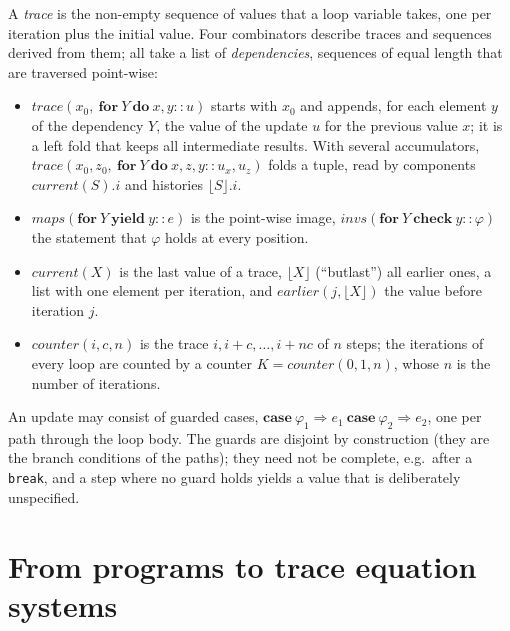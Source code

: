 \documentclass[a4paper,11pt]{article}
\newcommand{\tr}[1]{\lfloor #1\rfloor}
\begin{document}
A \emph{trace} is the non-empty sequence of values that a loop variable takes, one per iteration plus the initial
value. Four combinators describe traces and sequences derived from them; all take a list of \emph{dependencies},
sequences of equal length that are traversed point-wise:
\begin{itemize}
\item $\mathit{trace}(x_0,\ \textbf{for}\ Y \ \textbf{do}\ x, y :: u)$ starts with $x_0$ and appends, for each
  element $y$ of the dependency $Y$, the value of the update $u$ for the previous value $x$; it is a left fold that
  keeps all intermediate results. With several accumulators, $\mathit{trace}(x_0, z_0,\ \textbf{for}\ Y\
  \textbf{do}\ x, z, y :: u_x, u_z)$ folds a tuple, read by components $\mathit{current}(S).i$ and histories
  $\tr{S}.i$.
\item $\mathit{maps}(\textbf{for}\ Y\ \textbf{yield}\ y :: e)$ is the point-wise image, $\mathit{invs}(\textbf{for}\
  Y\ \textbf{check}\ y :: \varphi)$ the statement that $\varphi$ holds at every position.
\item $\mathit{current}(X)$ is the last value of a trace, $\tr{X}$ (``butlast'') all earlier ones, a list with one
  element per iteration, and $\mathit{earlier}(j, \tr{X})$ the value before iteration $j$.
\item $\mathit{counter}(i, c, n)$ is the trace $i, i + c, \dots, i + n c$ of $n$ steps; the iterations of every loop
  are counted by a counter $K = \mathit{counter}(0, 1, n)$, whose $n$ is the number of iterations.
\end{itemize}
An update may consist of guarded cases, $\textbf{case}\ \varphi_1 \Rightarrow e_1\ \textbf{case}\ \varphi_2
\Rightarrow e_2$, one per path through the loop body. The guards are disjoint by construction (they are the branch
conditions of the paths); they need not be complete, e.g.\ after a \texttt{break}, and a step where no guard holds
yields a value that is deliberately unspecified.

\section{From programs to trace equation systems}
\label{sec:teq}
\end{document}
